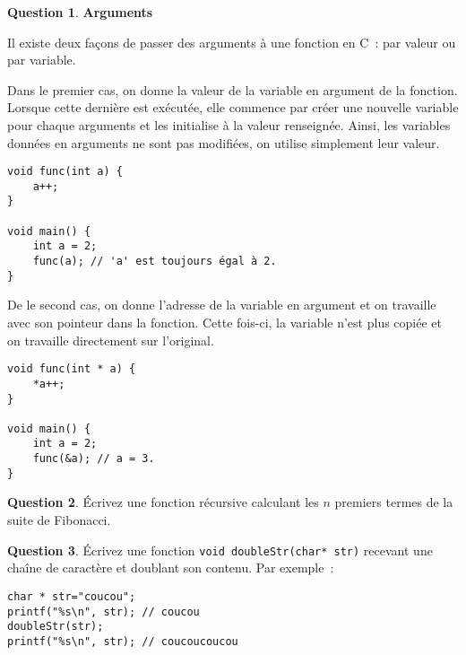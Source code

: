 \documentclass[11pt,a4paper,dvipsnames]{article}
\theoremstyle{definition}%
\newtheorem{Q}{Question}[] %
\begin{document}
\begin{Q} \textbf{Arguments}

Il existe deux façons de passer des arguments à une fonction en C~: par valeur ou par variable.

Dans le premier cas, on donne la valeur de la variable en argument de la fonction.
Lorsque cette dernière est exécutée, elle commence par créer une nouvelle variable pour chaque arguments et les initialise à la valeur renseignée.
Ainsi, les variables données en arguments ne sont pas modifiées, on utilise simplement leur valeur.
\begin{verbatim}
void func(int a) {
	a++;
}

void main() {
	int a = 2;
	func(a); // 'a' est toujours égal à 2.
}
\end{verbatim}

De le second cas, on donne l'adresse de la variable en argument et on travaille avec son pointeur dans la fonction.
Cette fois-ci, la variable n'est plus copiée et on travaille directement sur l'original.
\begin{verbatim}
void func(int * a) {
	*a++;
}

void main() {
	int a = 2;
	func(&a); // a = 3.
}
\end{verbatim}


\end{Q}



\begin{Q}
Écrivez une fonction récursive calculant les $n$ premiers termes de la suite de Fibonacci.
\end{Q}




\begin{Q}
Écrivez une fonction \texttt{void doubleStr(char* str)} recevant une chaîne de caractère et doublant son contenu.
Par exemple~:
\begin{verbatim}
char * str="coucou";
printf("%s\n", str); // coucou
doubleStr(str);
printf("%s\n", str); // coucoucoucou
\end{verbatim}
\end{Q}
\end{document}
